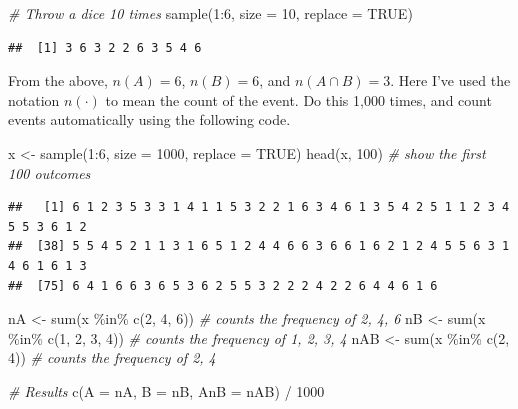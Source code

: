 \documentclass[
]{book}
\newenvironment{Shaded}{\begin{snugshade}}{\end{snugshade}}
\newcommand{\AttributeTok}[1]{\textcolor[rgb]{0.77,0.63,0.00}{#1}}
\newcommand{\CommentTok}[1]{\textcolor[rgb]{0.56,0.35,0.01}{\textit{#1}}}
\newcommand{\ConstantTok}[1]{\textcolor[rgb]{0.00,0.00,0.00}{#1}}
\newcommand{\DecValTok}[1]{\textcolor[rgb]{0.00,0.00,0.81}{#1}}
\newcommand{\FunctionTok}[1]{\textcolor[rgb]{0.00,0.00,0.00}{#1}}
\newcommand{\NormalTok}[1]{#1}
\newcommand{\OtherTok}[1]{\textcolor[rgb]{0.56,0.35,0.01}{#1}}
\newcommand{\SpecialCharTok}[1]{\textcolor[rgb]{0.00,0.00,0.00}{#1}}
\theoremstyle{definition}
\theoremstyle{definition}
\theoremstyle{definition}
\theoremstyle{definition}
\theoremstyle{remark}
\begin{document}
\begin{Shaded}
\begin{Highlighting}[]
\CommentTok{\# Throw a dice 10 times}
\FunctionTok{sample}\NormalTok{(}\DecValTok{1}\SpecialCharTok{:}\DecValTok{6}\NormalTok{, }\AttributeTok{size =} \DecValTok{10}\NormalTok{, }\AttributeTok{replace =} \ConstantTok{TRUE}\NormalTok{)}
\end{Highlighting}
\end{Shaded}

\begin{verbatim}
##  [1] 3 6 3 2 2 6 3 5 4 6
\end{verbatim}

From the above, \(n(A) = 6\), \(n(B)=6\), and \(n(A \cap B)=3\).
Here I've used the notation \(n(\cdot)\) to mean the count of the event.
Do this 1,000 times, and count events automatically using the following code.

\begin{Shaded}
\begin{Highlighting}[]
\NormalTok{x }\OtherTok{\textless{}{-}} \FunctionTok{sample}\NormalTok{(}\DecValTok{1}\SpecialCharTok{:}\DecValTok{6}\NormalTok{, }\AttributeTok{size =} \DecValTok{1000}\NormalTok{, }\AttributeTok{replace =} \ConstantTok{TRUE}\NormalTok{)}
\FunctionTok{head}\NormalTok{(x, }\DecValTok{100}\NormalTok{)  }\CommentTok{\# show the first 100 outcomes}
\end{Highlighting}
\end{Shaded}

\begin{verbatim}
##   [1] 6 1 2 3 5 3 3 1 4 1 1 5 3 2 2 1 6 3 4 6 1 3 5 4 2 5 1 1 2 3 4 5 5 3 6 1 2
##  [38] 5 5 4 5 2 1 1 3 1 6 5 1 2 4 4 6 6 3 6 6 1 6 2 1 2 4 5 5 6 3 1 4 6 1 6 1 3
##  [75] 6 4 1 6 6 3 6 5 3 6 2 5 5 3 2 2 2 4 2 2 6 4 4 6 1 6
\end{verbatim}

\begin{Shaded}
\begin{Highlighting}[]
\NormalTok{nA }\OtherTok{\textless{}{-}} \FunctionTok{sum}\NormalTok{(x }\SpecialCharTok{\%in\%} \FunctionTok{c}\NormalTok{(}\DecValTok{2}\NormalTok{, }\DecValTok{4}\NormalTok{, }\DecValTok{6}\NormalTok{))  }\CommentTok{\# counts the frequency of 2, 4, 6}
\NormalTok{nB }\OtherTok{\textless{}{-}} \FunctionTok{sum}\NormalTok{(x }\SpecialCharTok{\%in\%} \FunctionTok{c}\NormalTok{(}\DecValTok{1}\NormalTok{, }\DecValTok{2}\NormalTok{, }\DecValTok{3}\NormalTok{, }\DecValTok{4}\NormalTok{))  }\CommentTok{\# counts the frequency of 1, 2, 3, 4}
\NormalTok{nAB }\OtherTok{\textless{}{-}} \FunctionTok{sum}\NormalTok{(x }\SpecialCharTok{\%in\%} \FunctionTok{c}\NormalTok{(}\DecValTok{2}\NormalTok{, }\DecValTok{4}\NormalTok{))  }\CommentTok{\# counts the frequency of 2, 4}

\CommentTok{\# Results}
\FunctionTok{c}\NormalTok{(}\AttributeTok{A =}\NormalTok{ nA, }\AttributeTok{B =}\NormalTok{ nB, }\AttributeTok{AnB =}\NormalTok{ nAB) }\SpecialCharTok{/} \DecValTok{1000}
\end{Highlighting}
\end{Shaded}
\end{document}
